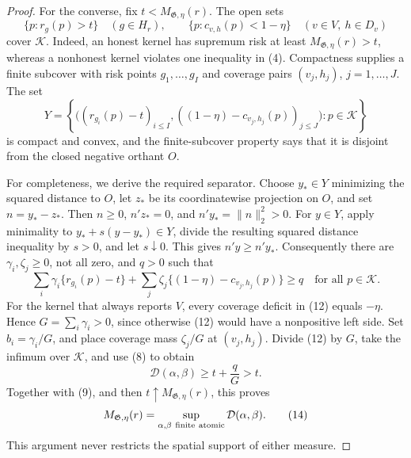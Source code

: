 \documentclass{article}
\begin{document}
\begin{proof}
For the converse, fix \(t<M_{\mathfrak G,\eta}(r)\).  The open sets
\[
 \{p:r_g(p)>t\}\quad(g\in H_r),\qquad
 \{p:c_{v,h}(p)<1-\eta\}\quad(v\in V,\ h\in D_v)
\tag{10}
\]
cover \(\mathscr K\).  Indeed, an honest kernel has supremum risk at least
\(M_{\mathfrak G,\eta}(r)>t\), whereas a nonhonest kernel violates one
inequality in (4).  Compactness supplies a finite subcover with risk points
\(g_1,\ldots,g_I\) and coverage pairs
\((v_j,h_j)\), \(j=1,\ldots,J\).  The set
\[
 Y=\left\{
 \bigl((r_{g_i}(p)-t)_{i\leq I},
 ((1-\eta)-c_{v_j,h_j}(p))_{j\leq J}\bigr):
 p\in\mathscr K
 \right\}
\tag{11}
\]
is compact and convex, and the finite-subcover property says that it is
disjoint from the closed negative orthant \(O\).

For completeness, we derive the required separator.  Choose
\(y_*\in Y\) minimizing the squared distance to \(O\), let \(z_*\) be its
coordinatewise projection on \(O\), and set \(n=y_*-z_*\).  Then
\(n\geq0\), \(n'z_*=0\), and \(n'y_*=\|n\|_2^2>0\).  For \(y\in Y\),
apply minimality to \(y_*+s(y-y_*)\in Y\), divide the resulting squared
distance inequality by \(s>0\), and let \(s\downarrow0\).  This gives
\(n'y\geq n'y_*\).  Consequently there are
\(\gamma_i,\zeta_j\geq0\), not all zero, and \(q>0\) such that
\[
 \sum_i\gamma_i\{r_{g_i}(p)-t\}
 +\sum_j\zeta_j\{(1-\eta)-c_{v_j,h_j}(p)\}
 \geq q
 \quad\text{for all }p\in\mathscr K.
\tag{12}
\]
For the kernel that always reports \(V\), every coverage deficit in (12)
equals \(-\eta\).  Hence \(G=\sum_i\gamma_i>0\), since otherwise (12)
would have a nonpositive left side.  Set \(b_i=\gamma_i/G\), and place
coverage mass \(\zeta_j/G\) at \((v_j,h_j)\).  Divide (12) by \(G\), take
the infimum over \(\mathscr K\), and use (8) to obtain
\[
 \mathcal D(\alpha,\beta)\geq t+\frac qG>t.
\tag{13}
\]
Together with (9), and then \(t\uparrow M_{\mathfrak G,\eta}(r)\), this
proves
\[
 M_{\mathfrak G,\eta}(r)
 =\sup_{\alpha,\beta\ {\rm finite\ atomic}}\mathcal D(\alpha,\beta).
\tag{14}
\]
This argument never restricts the spatial support of either measure.


\end{proof}
\end{document}
